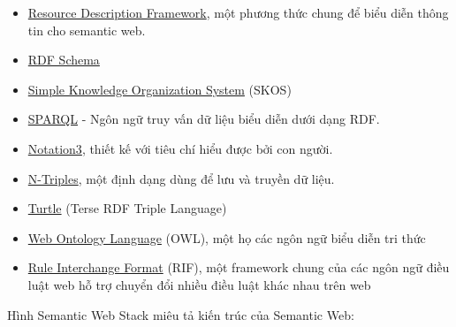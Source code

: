 \begin{itemize}
\item \href{http://en.wikipedia.org/wiki/Resource\_Description\_Framework}{Resource Description Framework}, một phương thức chung để biểu diễn thông tin cho semantic web.
\item \href{http://en.wikipedia.org/wiki/RDF_Schema}{RDF Schema}
\item \href{http://en.wikipedia.org/wiki/Simple_Knowledge_Organization_System}{Simple Knowledge Organization System} (SKOS)
\item \href{http://en.wikipedia.org/wiki/SPARQL}{SPARQL} - Ngôn ngữ truy vấn dữ liệu biểu diễn dưới dạng RDF.
\item \href{http://en.wikipedia.org/wiki/Notation3}{Notation3}, thiết kế với tiêu chí hiểu được bởi con người.
\item \href{http://en.wikipedia.org/wiki/N-Triples}{N-Triples}, một định dạng dùng để lưu và truyền dữ liệu.
\item \href{http://en.wikipedia.org/wiki/Turtle_(syntax)}{Turtle} (Terse RDF Triple Language)
\item \href{http://en.wikipedia.org/wiki/Web_Ontology_Language}{Web Ontology Language} (OWL), một họ các ngôn ngữ biểu diễn tri thức
\item \href{}{Rule Interchange Format} (RIF), một framework chung của các ngôn ngữ điều luật web hỗ trợ chuyển đổi nhiều điều luật khác nhau trên web
\end{itemize}

Hình Semantic Web Stack\cite{semantic3} miêu tả kiến trúc của Semantic Web:

